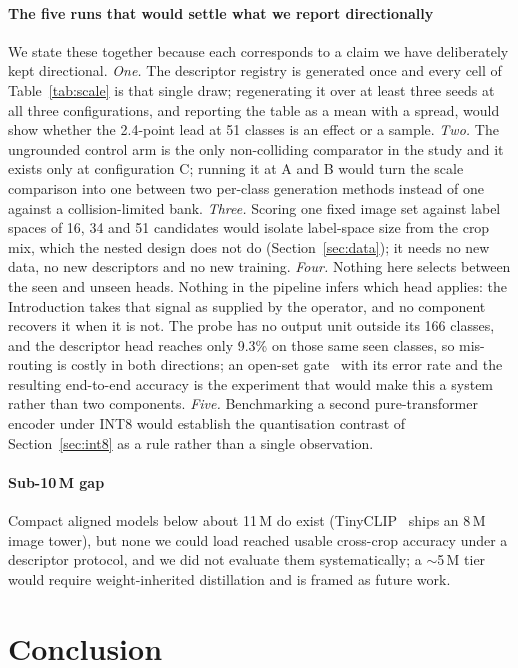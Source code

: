 \documentclass[a4paper,fleqn]{cas-dc}
\begin{document}
\paragraph{The five runs that would settle what we report directionally} We state these together
because each corresponds to a claim we have deliberately kept directional. \emph{One.} The
descriptor registry is generated once and every cell of Table~\ref{tab:scale} is that single draw;
regenerating it over at least three seeds at all three configurations, and reporting the table as a
mean with a spread, would show whether the 2.4-point lead at 51 classes is an effect or a sample.
\emph{Two.} The ungrounded control arm is the only non-colliding comparator in the study and it
exists only at configuration C; running it at A and B would turn the scale comparison into one
between two per-class generation methods instead of one against a collision-limited bank.
\emph{Three.} Scoring one fixed image set against label spaces of 16, 34 and 51 candidates would
isolate label-space size from the crop mix, which the nested design does not do
(Section~\ref{sec:data}); it needs no new data, no new descriptors and no new training.
\emph{Four.} Nothing here selects between the seen and unseen heads. Nothing in the pipeline infers which head applies: the Introduction takes that signal as supplied by the operator, and no component recovers it when it is not. The probe has no output unit outside its 166 classes, and the descriptor head reaches only 9.3\% on those same seen classes, so mis-routing is costly in both directions; an open-set gate~\citep{scheirer2013openset} with its error rate and the resulting
end-to-end accuracy is the experiment that would make this a system rather than two components.
\emph{Five.} Benchmarking a second pure-transformer encoder under INT8 would establish the
quantisation contrast of Section~\ref{sec:int8} as a rule rather than a single observation.

\paragraph{Sub-10\,M gap} Compact aligned models below about 11\,M do exist (TinyCLIP~\citep{wu2023} ships an
8\,M image tower), but none we could load reached usable cross-crop accuracy under a
descriptor protocol, and we did not evaluate them systematically; a
$\sim$5\,M tier would require weight-inherited distillation and is framed as future work.

\section{Conclusion}
\end{document}
